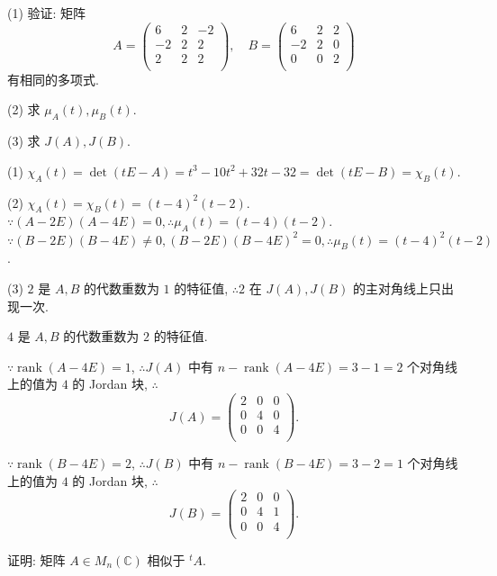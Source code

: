 \documentclass{ctexart}
\begin{document}
\begin{exercise}%
    (1) 验证: 矩阵
    \[A=\begin{pmatrix}
        6 & 2 & -2 \\
        -2 & 2 & 2 \\
        2 & 2 & 2 \\
    \end{pmatrix},\quad B=\begin{pmatrix}
        6 & 2 & 2 \\
        -2 & 2 & 0 \\
        0 & 0 & 2 \\
    \end{pmatrix}\]
    有相同的多项式.

    (2) 求 $\mu_A(t),\mu_B(t)$.

    (3) 求 $J(A),J(B)$.
\end{exercise}
\begin{solution}
    (1) $\chi_A(t)=\det(tE-A)=t^3-10t^2+32t-32=\det(tE-B)=\chi_B(t)$.

    (2) $\chi_A(t)=\chi_B(t)=(t-4)^2(t-2)$. $\because(A-2E)(A-4E)=0,\therefore\mu_A(t)=(t-4)(t-2)$. $\because(B-2E)(B-4E)\neq0,(B-2E)(B-4E)^2=0,\therefore\mu_B(t)=(t-4)^2(t-2)$.

    (3) $2$ 是 $A,B$ 的代数重数为 $1$ 的特征值, $\therefore2$ 在 $J(A),J(B)$ 的主对角线上只出现一次.

    $4$ 是 $A,B$ 的代数重数为 $2$ 的特征值.

    $\because\operatorname{rank}(A-4E)=1$, $\therefore J(A)$ 中有 $n-\operatorname{rank}(A-4E)=3-1=2$ 个对角线上的值为 $4$ 的 Jordan 块, $\therefore$
    \[J(A)=\begin{pmatrix}
        2 & 0 & 0 \\
        0 & 4 & 0 \\
        0 & 0 & 4 \\
    \end{pmatrix}.\]

    $\because\operatorname{rank}(B-4E)=2$, $\therefore J(B)$ 中有 $n-\operatorname{rank}(B-4E)=3-2=1$ 个对角线上的值为 $4$ 的 Jordan 块, $\therefore$
    \[J(B)=\begin{pmatrix}
        2 & 0 & 0 \\
        0 & 4 & 1 \\
        0 & 0 & 4 \\
    \end{pmatrix}.\]
\end{solution}
\begin{exercise}%
    证明: 矩阵 $A\in M_n(\mathbb{C})$ 相似于 $^tA$.
\end{exercise}
\end{document}
